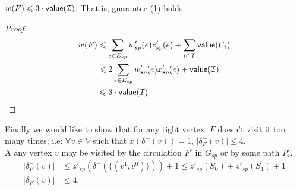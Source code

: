 \documentclass[./main.tex]{subfiles}
\begin{document}
		\begin{claim}
			$w(F) \leqslant 3\cdot\textsf{\textup{value}}(\mathcal{I})$. That is, guarantee \hyperref[lemm:main:1]{(1)} holds.
		\end{claim}
		\begin{proof}
			\begin{align*}
				w(F) &\leqslant \sum_{e \in E_{sp}} w'_{sp}(e)z'_{sp}(e) + \sum_{i \in [l]} \textsf{\textup{value}}(U_i)\\
				 &\leqslant 2\sum_{e\in E_{sp}}w'_{sp}(e)x'_{sp}(e) + \textsf{\textup{value}}(\mathcal{I})\\
			 	&\leqslant 3\cdot\textsf{\textup{value}}(\mathcal{I})
			\end{align*}
		\end{proof}
		Finally we would like to show that for any tight vertex, $F$ doesn't visit it too many times; i.e: $\forall v \in V$ such that $x(\delta^-(v)) = 1$, $|\delta^-_F(v)| \leqslant 4$.\\
		A any vertex $v$ may be visited by the circulation $F'$ in $G_{sp}$ or by some path $P_i$.
		\begin{align*}
			|\delta^-_F(v)| &\leqslant z'_{sp}(\delta^-(\{(v^1, v^0)\})) + 1 \leqslant z'_{sp}(S_0) + z'_{sp}(S_1) + 1\\
			|\delta^-_F(v)| &\leqslant 4.
		\end{align*}
\end{document}

